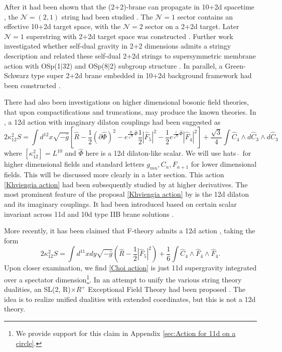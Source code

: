 After it had been shown that the (2+2)-brane can propagate in 10+2d spacetime \cite{Blencowe:1988sk}, the $\mathcal N=(2,1)$ string had been studied \cite{Kutasov:1996fp, Kutasov:1996zm, Martinec:1996wn}. The $\mathcal N=1$ sector contains an effective 10+2d target space, with the $\mathcal N=2$ sector on a 2+2d target. 
Later $\mathcal N=1$ superstring with 2+2d target space was constructed \cite{Khviengia:1995pm,Lu:1995pn}.
Further work investigated whether self-dual gravity in 2+2 dimensions admits a stringy description \cite{Sezgin:1995fj} and related these self-dual 2+2d strings to supersymmetric membrane action with OSp(1$|$32) and OSp(8$|$2) subgroup structure \cite{Ketov:1996gr}.
In parallel, a Green-Schwarz type super 2+2d brane embedded in 10+2d background framework had been constructed \cite{Hewson:1996yh,Hewson:1997wv,Hewson:1998sw}.

There had also been investigations on higher dimensional bosonic field theories, that upon compactifications and truncations, may produce the known theories.
In \cite{Khviengia:1997rh}, a 12d action with imaginary dilaton couplings had been suggested as
\begin{equation}
2\kappa_{12}^2S
=\int d^{12}x\sqrt{-\hat{g}}
\left[
\hat R-\frac{1}{2}(\partial\hat{\Phi})^2-e^{\frac{2i}{\sqrt{5}} \hat{\Phi}}
\frac{1}{2}|\hat{F}_5|^2
-\frac{1}{2}e^{\frac{i}{\sqrt{5}}\hat{\Phi} }|\hat{F}_4|^2
\right]
+\frac{\sqrt{3}}{4}\int \hat{C}_4\wedge d\hat{C}_3 \wedge d\hat{C}_3
\label{Khviengia action}
\end{equation}
where $[\kappa_{12}^2]=L^{10}$ and $\hat{\Phi}$ here is a 12d dilaton-like scalar.
We will use hats $\hat{\;}$ for higher dimensional fields and standard letters $g_{mn},C_n,F_{n+1}$ for lower dimensional fields. 
This will be discussed more clearly in a later section.
This action \eqref{Khviengia action} had been subsequently studied by \cite{Bakhtiarizadeh:2018upg} at higher derivatives. 
The most prominent feature of the proposal \eqref{Khviengia action} by \cite{Khviengia:1997rh} is the 12d dilaton and its imaginary couplings.
It had been introduced based on certain scalar invariant \cite{Lu:1995cs} across 11d and 10d type IIB brane solutions \cite{Khviengia:1997rh}.

More recently, it has been claimed that F-theory \cite{Vafa:1996xn} admits a 12d action \cite{Choi:2014vya,Choi:2015gia}, taking the form
\begin{equation}
2\kappa_{12}^2S = \int d^{11}x dy \sqrt{-\hat{g}}
\left(
\hat{R}-\frac{1}{2}|\hat{F}_5|^2
\right)
+\frac{1}{6}
\int \hat{C}_4\wedge \hat{F}_4 \wedge \hat{F}_4.
\label{Choi action}
\end{equation}
Upon closer examination, we find \eqref{Choi action} is just 11d supergravity integrated over a spectator dimension\footnote{
We provide support for this claim in Appendix \ref{sec:Action for 11d on a circle}.
}.
In an attempt to unify the various string theory dualities, an SL(2, R)$\times R^+$ Exceptional Field Theory had been proposed \cite{Berman:2015rcc,Rudolph:2017vzy}.
The idea is to realize unified dualities with extended coordinates, but this is not a 12d theory.

